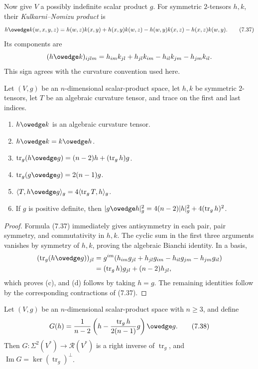 Now give $V$ a possibly indefinite scalar product $g$.  For symmetric
$2$-tensors $h,k$, their \emph{Kulkarni--Nomizu product} is
\begin{equation}
h \owedge k(w,x,y,z) = h(w,z)k(x,y) + h(x,y)k(w,z)
{}- h(w,y)k(x,z) - h(x,z)k(w,y). \tag{7.37}
\end{equation}
Its components are
\[
(h\owedge k)_{ijlm}
=h_{im}k_{jl}+h_{jl}k_{im}-h_{il}k_{jm}-h_{jm}k_{il}.
\]
This sign agrees with the curvature convention used here.

\begin{lemma}
\label{lem:kulkarni-nomizu-properties}
Let $(V,g)$ be an $n$-dimensional scalar-product space, let $h,k$ be
symmetric $2$-tensors, let $T$ be an algebraic curvature tensor, and trace on
the first and last indices.
\begin{enumerate}
\item[(a)] $h\owedge k$ is an algebraic curvature tensor.
\item[(b)] $h\owedge k=k\owedge h$.
\item[(c)] $\operatorname{tr}_g(h\owedge g)
=(n-2)h+(\operatorname{tr}_gh)g$.
\item[(d)] $\operatorname{tr}_g(g\owedge g)=2(n-1)g$.
\item[(e)] $\langle T,h\owedge g\rangle_g
=4\langle\operatorname{tr}_gT,h\rangle_g$.
\item[(f)] If $g$ is positive definite, then
$|g\owedge h|_g^2=4(n-2)|h|_g^2+4(\operatorname{tr}_gh)^2$.
\end{enumerate}
\end{lemma}

\begin{proof}
\sketch
Formula (7.37) immediately gives antisymmetry in each pair, pair symmetry,
and commutativity in $h,k$.  The cyclic sum in the first three arguments
vanishes by symmetry of $h,k$, proving the algebraic Bianchi identity.  In a
basis,
\begin{align*}
(\operatorname{tr}_g(h\owedge g))_{jl}
&=g^{im}(h_{im}g_{jl}+h_{jl}g_{im}-h_{il}g_{jm}-h_{jm}g_{il})\\
&=(\operatorname{tr}_gh)g_{jl}+(n-2)h_{jl},
\end{align*}
which proves (c), and (d) follows by taking $h=g$.  The remaining identities
follow by the corresponding contractions of (7.37).
\end{proof}

\begin{proposition}
\label{prop:right-inverse-trace}

Let $(V,g)$ be an $n$-dimensional scalar-product space with $n\geq3$, and
define
\begin{equation}
G(h) = \frac{1}{n-2}\left(h - \frac{\operatorname{tr}_g h}{2(n-1)}g\right)
\owedge g. \tag{7.38}
\end{equation}
Then $G:\Sigma^2(V^*)\to\mathscr R(V^*)$ is a right inverse of
$\operatorname{tr}_g$, and
$\operatorname{Im}G=\ker(\operatorname{tr}_g)^\perp$.
\end{proposition}

